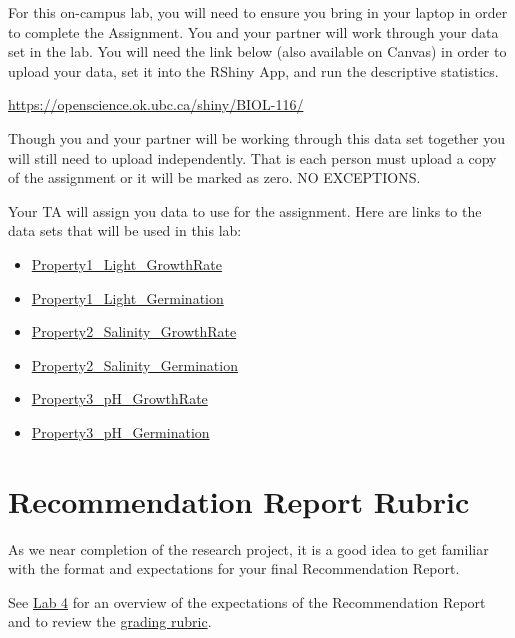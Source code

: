 \documentclass[
]{book}
\providecommand{\tightlist}{%
  \setlength{\itemsep}{0pt}\setlength{\parskip}{0pt}}
\begin{document}
For this on-campus lab, you will need to ensure you bring in your laptop in order to complete the Assignment. You and your partner will work through your data set in the lab. You will need the link below (also available on Canvas) in order to upload your data, set it into the RShiny App, and run the descriptive statistics.

\url{https://openscience.ok.ubc.ca/shiny/BIOL-116/}

Though you and your partner will be working through this data set together you will still need to upload independently. That is each person must upload a copy of the assignment or it will be marked as zero. NO EXCEPTIONS.

Your TA will assign you data to use for the assignment. Here are links to the data sets that will be used in this lab:

\begin{itemize}
\tightlist
\item
  \href{https://osf.io/download/pu6tb}{Property1\_Light\_GrowthRate}
\item
  \href{https://osf.io/download/a7qgj}{Property1\_Light\_Germination}
\item
  \href{https://osf.io/download/pf4ym}{Property2\_Salinity\_GrowthRate}
\item
  \href{https://osf.io/download/ak6cs}{Property2\_Salinity\_Germination}
\item
  \href{https://osf.io/download/5ravz}{Property3\_pH\_GrowthRate}
\item
  \href{https://osf.io/download/rsp6q}{Property3\_pH\_Germination}
\end{itemize}

\hypertarget{recommendation-report-rubric}{%
\section*{Recommendation Report Rubric}\label{recommendation-report-rubric}}

As we near completion of the research project, it is a good idea to get familiar with the format and expectations for your final Recommendation Report.

See \href{https://ubco-biology.github.io/BIOL-125-Lab-Manual-Summer/assignment-recommendation-report.html}{Lab 4} for an overview of the expectations of the Recommendation Report and to review the \href{https://ubco-biology.github.io/BIOL-125-Lab-Manual-Summer/recommendation-report-rubric-1.html}{grading rubric}.
\end{document}
